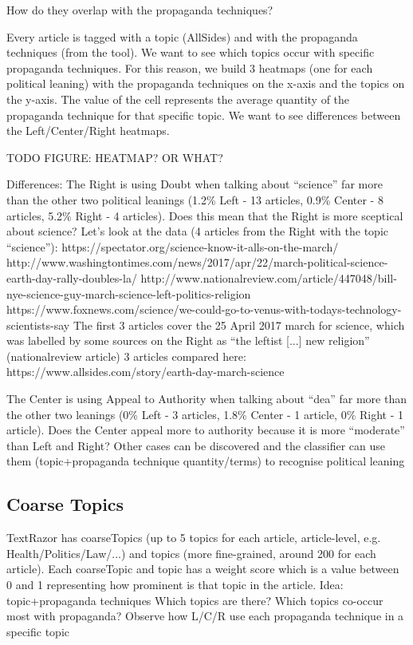 How do they overlap with the propaganda techniques?

Every article is tagged with a topic (AllSides) and with the propaganda techniques (from the tool).
We want to see which topics occur with specific propaganda techniques.
For this reason, we build 3 heatmaps (one for each political leaning) with the propaganda techniques on the x-axis and the topics on the y-axis. The value of the cell represents the average quantity of the propaganda technique for that specific topic.
We want to see differences between the Left/Center/Right heatmaps.

TODO FIGURE: HEATMAP? OR WHAT?

Differences:
The Right is using Doubt when talking about “science” far more than the other two political leanings (1.2\% Left - 13 articles, 0.9\% Center - 8 articles, 5.2\% Right - 4 articles). Does this mean that the Right is more sceptical about science? Let’s look at the data (4 articles from the Right with the topic “science”):
https://spectator.org/science-know-it-alls-on-the-march/
http://www.washingtontimes.com/news/2017/apr/22/march-political-science-earth-day-rally-doubles-la/ 
http://www.nationalreview.com/article/447048/bill-nye-science-guy-march-science-left-politics-religion
https://www.foxnews.com/science/we-could-go-to-venus-with-todays-technology-scientists-say 
The first 3 articles cover the 25 April 2017 march for science, which was labelled by some sources on the Right as “the leftist [...] new religion” (nationalreview article)
3 articles compared here: https://www.allsides.com/story/earth-day-march-science 

The Center is using Appeal to Authority when talking about “dea” far more than the other two leanings (0\% Left - 3 articles, 1.8\% Center - 1 article, 0\% Right - 1 article). Does the Center appeal more to authority because it is more “moderate” than Left and Right?
Other cases can be discovered and the classifier can use them (topic+propaganda technique quantity/terms) to recognise political leaning



\subsection{Coarse Topics}

TextRazor has coarseTopics (up to 5 topics for each article, article-level, e.g. Health/Politics/Law/...) and topics (more fine-grained, around 200 for each article). Each coarseTopic and topic has a weight score which is a value between 0 and 1 representing how prominent is that topic in the article.
Idea: topic+propaganda techniques
Which topics are there?
Which topics co-occur most with propaganda?
Observe how L/C/R use each propaganda technique in a specific topic



